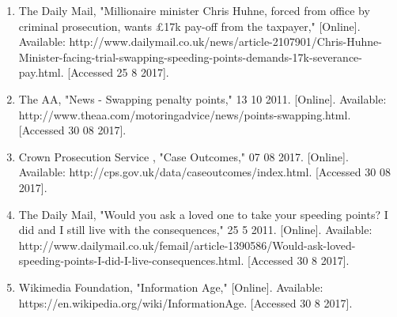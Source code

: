 \begin{enumerate}
	\item The Daily Mail, "Millionaire minister Chris Huhne, forced from office by criminal prosecution, wants £17k pay-off from the taxpayer," [Online]. Available: http://www.dailymail.co.uk/news/article-2107901/Chris-Huhne-Minister-facing-trial-swapping-speeding-points-demands-17k-severance-pay.html. [Accessed 25 8 2017].
	\item The AA, "News - Swapping penalty points," 13 10 2011. [Online]. Available: http://www.theaa.com/motoring{\textunderscore}advice/news/points-swapping.html. [Accessed 30 08 2017].
	\item Crown Prosecution Service , "Case Outcomes," 07 08 2017. [Online]. Available: http://cps.gov.uk/data/case{\textunderscore}outcomes/index.html. [Accessed 30 08 2017].
	\item The Daily Mail, "Would you ask a loved one to take your speeding points? I did and I still live with the consequences," 25 5 2011. [Online]. Available: http://www.dailymail.co.uk/femail/article-1390586/Would-ask-loved-speeding-points-I-did-I-live-consequences.html. [Accessed 30 8 2017].
	\item Wikimedia Foundation, "Information Age," [Online]. Available: https://en.wikipedia.org/wiki/Information{\textunderscore}Age. [Accessed 30 8 2017].
\end{enumerate}
